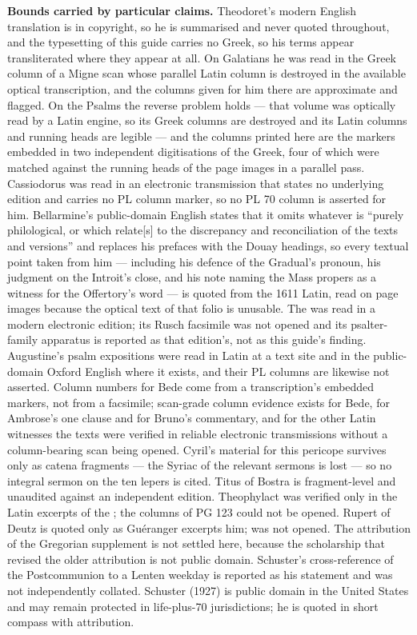 \textbf{Bounds carried by particular claims.} Theodoret's modern English
translation is in copyright, so he is summarised and never quoted throughout,
and the typesetting of this guide carries no Greek, so his terms appear
transliterated where they appear at all. On Galatians he was read in the Greek
column of a Migne scan whose parallel Latin column is destroyed in the
available optical transcription, and the columns given for him there are
approximate and flagged. On the Psalms the reverse problem holds --- that
volume was optically read by a Latin engine, so its Greek columns are destroyed
and its Latin columns and running heads are legible --- and the columns printed
here are the markers embedded in two independent digitisations of the Greek,
four of which were matched against the running heads of the page images in a
parallel pass. Cassiodorus was read in an electronic transmission that states
no underlying edition and carries no PL column marker, so no PL 70 column is
asserted for him. Bellarmine's public-domain English states that it omits
whatever is ``purely philological, or which relate[s] to the discrepancy and
reconciliation of the texts and versions'' and replaces his prefaces with the
Douay headings, so every textual point taken from him --- including his defence
of the Gradual's pronoun, his judgment on the Introit's close, and his note
naming the Mass propers as a witness for the Offertory's word --- is quoted
from the 1611 Latin, read on page images because the optical text of that folio
is unusable. The  was read in a modern electronic
edition; its Rusch facsimile was not opened and its psalter-family apparatus is
reported as that edition's, not as this guide's finding.  Augustine's psalm expositions were read in Latin at a text
site and in the public-domain Oxford English where it exists, and their PL
columns are likewise not asserted. Column numbers for Bede come from
a transcription's embedded markers, not from a facsimile; scan-grade column
evidence exists for Bede, for Ambrose's one clause and for Bruno's commentary,
and for the other Latin witnesses the texts were verified in reliable
electronic transmissions without a column-bearing scan being opened. Cyril's
material for this pericope survives only as catena fragments --- the Syriac of
the relevant sermons is lost --- so no integral sermon on the ten lepers is
cited. Titus of Bostra is fragment-level and unaudited against an independent
edition. Theophylact was verified only in the Latin excerpts of the
; the columns of PG 123 could not be opened. Rupert of Deutz
is quoted only as Guéranger excerpts him;  was not
opened. The attribution of the Gregorian supplement is not settled here,
because the scholarship that revised the older attribution is not public
domain. Schuster's cross-reference of the Postcommunion to a Lenten weekday is
reported as his statement and was not independently collated. Schuster (1927)
is public domain in the United States and may remain protected in life-plus-70
jurisdictions; he is quoted in short compass with attribution.

